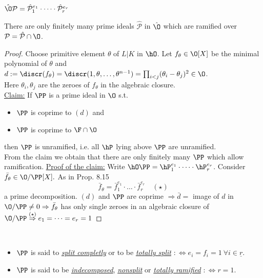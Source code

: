 
\hspace*{4cm}$\hat \O \mathcal{P}  = \hat{\mathcal P}_1^{e_1} \cdot \dots \cdot \hat{\mathcal P}_r^{e_r}$ \quad \quad 
{}

\begin{Prop}
There are only finitely many prime ideals $\hat{\mathcal P}$ in $\hat \O$ which are ramified over $\mathcal{P}= \hat{\mathcal P} \cap \O$.
\end{Prop}

\begin{proof}
Choose primitive element $\theta$ of $L | K$ in $\hO$. Let $f_\theta \in \O[X]$ be the minimal polynomial of $\theta$ and $d:=\discr(f_\theta)=\discr(1, \theta, \ldots, \theta^{n-1})=\prod_{i <j}(\theta_i-\theta_j)^2 \in \O$.\\
Here $\theta_i, \theta_j$ are the zeroes of $f_\theta$ in the algebraic closure.\\
\underline{Claim:} If $\PP$ is a prime ideal in $\O$ s.t.
\begin{itemize}
\item $\PP$ is coprime to $(d)$ and
\item $\PP$ is coprime to $\F \cap \O$
\end{itemize}
then $\PP$ is unramified, i.e. all $\hP$ lying above $\PP$ are unramified.\\
From the claim we obtain that there are only finitely many $\PP$ which allow ramification.
\underline{Proof of the claim:} Write $\hO\PP=\hP_1^{e_1}\cdot \dots \cdot \hP_r^{e_r}$. Consider $\bar{f}_\theta\in \O/\PP[X].$ As in Prop. 8.15
\[\bar{f}_\theta = \bar{f}_1^{e_1} \cdot \ldots \cdot \bar{f}_r^{e_r} \quad  (\star)\]
a prime decomposition. $(d)$ and $\PP$ are coprime $\Rightarrow \bar{d}=$ image of $d$ in $\O/\PP \neq 0 \Rightarrow \bar{f}_\theta$ has only single zeroes in an algebraic closure of $\O/\PP \stackrel{(\star)}{\Rightarrow} e_1=\dots=e_r=1$
\end{proof}

\begin{defi}\ \vspace*{-\baselineskip} \\
\begin{itemize}
\item $\PP$ is said to \emph{\underline{split completly}} or to be \emph{\underline{totally split}} $:\iff e_i=f_i=1 \ \forall i \in \underline{r}$.
\item $\PP$ is said to be \emph{\underline{indecomposed}}, \emph{\underline{nonsplit}} or \emph{\underline{totally ramified}} $:\iff r=1$.
\end{itemize}
\end{defi}

